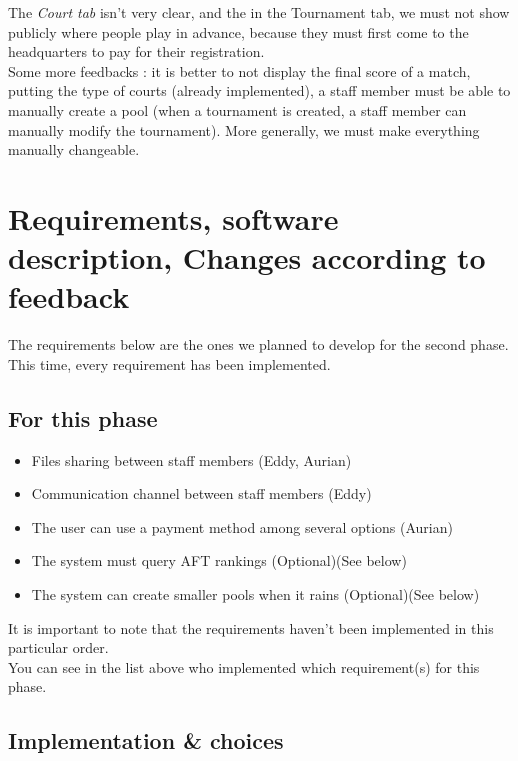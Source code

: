 \documentclass[a4paper, 12pt]{article}
\begin{document}
The \textit{Court tab} isn't very clear, and the in the Tournament tab, we must not show publicly where people play in advance, because they must first come to the headquarters to pay for their registration.\\

Some more feedbacks : it is better to not display the final score of a match, putting the type of courts (already implemented), a staff member must be able to manually create a pool (when a tournament is created, a staff member can manually modify the tournament). More generally, we must make everything manually changeable.
\newpage
\section{Requirements, software description, Changes according to feedback}

The requirements below are the ones we planned to develop for the second phase. This time, every requirement has been implemented. \\
\subsection{For this phase}
	
\begin{itemize}
 
\item Files sharing between staff members (Eddy, Aurian)
\item Communication channel between staff members (Eddy)
\item The user can use a payment method among several options (Aurian)
\item The system must query AFT rankings (Optional)(See below)
\item The system can create smaller pools when it rains (Optional)(See below)
\\
\end{itemize}

It is important to note that the requirements haven't been implemented in this particular order.\\

You can see in the list above who implemented which requirement(s) for this phase. 

\subsection{Implementation \& choices}
\end{document}
